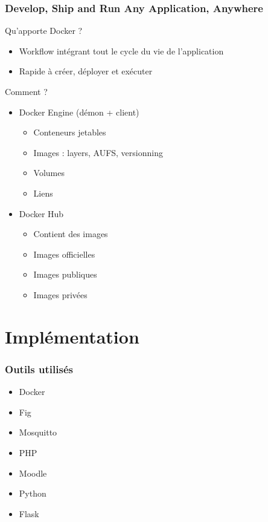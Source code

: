 \documentclass[10pt, compress]{beamer}
\begin{document}
\begin{frame}[fragile]
  \frametitle{Develop, Ship and Run Any Application, Anywhere}
  Qu'apporte Docker ?
  \pause
  \begin{itemize}[<+- | alert@+>]
  \item Workflow intégrant tout le cycle du vie de l'application
  \item Rapide à créer, déployer et exécuter
  \end{itemize}
  \pause
   Comment ?
   \pause
  
\begin{itemize}[<+- | alert@+>]
  \item Docker Engine (démon + client)
    \begin{itemize}[<+- | alert@+>]
      \item Conteneurs jetables
      \item Images : layers, AUFS, versionning
      \item Volumes
      \item Liens
    \end{itemize}
  \item Docker Hub
  \begin{itemize}[<+- | alert@+>]
      \item Contient des images
      \item Images officielles
      \item Images publiques
      \item Images privées
    \end{itemize}

\end{itemize}
\end{frame}


\section{Implémentation}

\begin{frame}[fragile]
  \frametitle{Outils utilisés}

  \begin{itemize}
      \item Docker
      \item Fig
      \item Mosquitto
      \item PHP
      \item Moodle
      \item Python
      \item Flask
    \end{itemize}
  
\end{frame}
\end{document}
